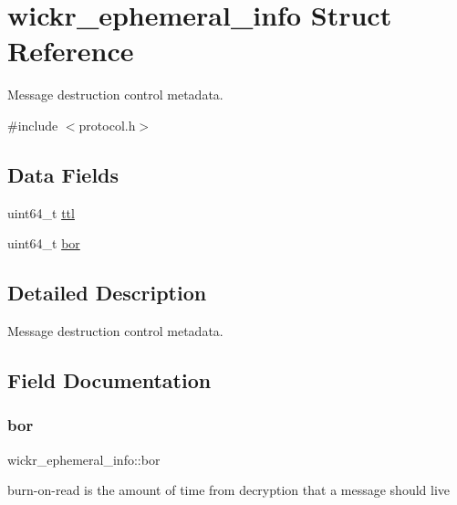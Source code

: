 \hypertarget{structwickr__ephemeral__info}{}\section{wickr\+\_\+ephemeral\+\_\+info Struct Reference}
\label{structwickr__ephemeral__info}


Message destruction control metadata.  




{\ttfamily \#include $<$protocol.\+h$>$}

\subsection*{Data Fields}
\begin{DoxyCompactItemize}
\item 
uint64\+\_\+t \mbox{\hyperlink{structwickr__ephemeral__info_ac7936b5b7b83dd24ab6b68e8dd2dd6ba}{ttl}}
\item 
uint64\+\_\+t \mbox{\hyperlink{structwickr__ephemeral__info_a0bfb5badb8bdcfac1ace1ef2026c86ac}{bor}}
\end{DoxyCompactItemize}


\subsection{Detailed Description}
Message destruction control metadata. 

\subsection{Field Documentation}
\mbox{\label{structwickr__ephemeral__info_a0bfb5badb8bdcfac1ace1ef2026c86ac}} 
\subsubsection{\texorpdfstring{bor}{bor}}
{\footnotesize\ttfamily wickr\+\_\+ephemeral\+\_\+info\+::bor}

burn-\/on-\/read is the amount of time from decryption that a message should live \mbox{\label{structwickr__ephemeral__info_ac7936b5b7b83dd24ab6b68e8dd2dd6ba}} 
